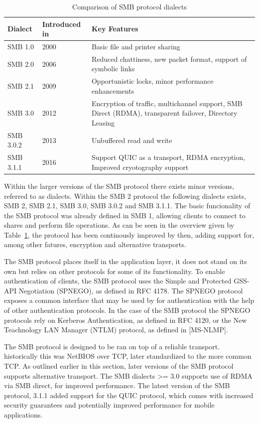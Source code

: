 \documentclass[english, 12pt, a4paper, elec, utf8, a-2b, online]{aaltothesis}
\begin{document}
\begin{table}[h]
\centering
\caption{Comparison of SMB protocol dialects}
\label{tab:smb_dialects}
\begin{tabular}{|l|p{5cm}|p{5cm}|}
\hline
\textbf{Dialect} & \textbf{Introduced in} & \textbf{Key Features}\\ \hline
SMB 1.0 & 2000 & Basic file and printer sharing \\ \hline
SMB 2.0 & 2006 & Reduced chattiness, new packet format, support of symbolic links \\ \hline
SMB 2.1 & 2009 & Opportunistic locks, minor performance enhancements \\ \hline
SMB 3.0 & 2012 & Encryption of traffic, multichannel support, SMB Direct (RDMA), transparent failover, Directory Leasing \\ \hline
SMB 3.0.2 & 2013 & Unbuffered read and write \\ \hline
SMB 3.1.1 & 2016 & Support QUIC as a transport, RDMA encryption, Improved cryotography support \\ \hline
\end{tabular}
\end{table}

Within the larger versions of the SMB protocol there exists minor versions, referred
to as dialects. Within the SMB 2 protocol the following dialects exists, SMB 2,
SMB 2.1, SMB 3.0, SMB 3.0.2 and SMB 3.1.1. The basic funcionality of the SMB protocol
was already defined in SMB 1, allowing clients to connect to shares and perform file
operations. As can be seen in the overview given by Table~\ref{tab:smb_dialects},
the protocol has been continously improved by then, adding support for, among other
fatures, encryption and alternative transports\cite{smb2_tech}.

The SMB protocol places itself in the application layer, it does not stand on its
own but relies on other protocols for some of its functionality. To enable authentication
of clients, the SMB protocol uses the Simple and Protected GSS-API Negotiation (SPNEGO), as
defined in RFC 4178\cite{rfc4178}. The SPNEGO protocol exposes a common interface
that may be used by for authentication with the help of other authentication protocols.
In the case of the SMB protocol the SPNEGO protocols rely on Kerberos Authentication, as
defined in RFC 4120\cite{rfc4120}, or the New Teachnology LAN Manager (NTLM) protocol,
as defined in {[MS-NLMP]}\cite{ntlm_tech}.

The SMB protocol is designed to be ran on top of a reliable transport. historically
this was NetBIOS over TCP, later standardized to the more common TCP. As outlined earlier
in this section, later versions of the SMB protocol supports alternative transport. The
SMB dialects >= 3.0 supports use of RDMA via SMB direct, for improved performance.
The latest version of the SMB protocol, 3.1.1 added support for the QUIC protocol,
which comes with increased security guarantees and potentially improved performance
for mobile applications\cite{smb2_tech}.
\end{document}
